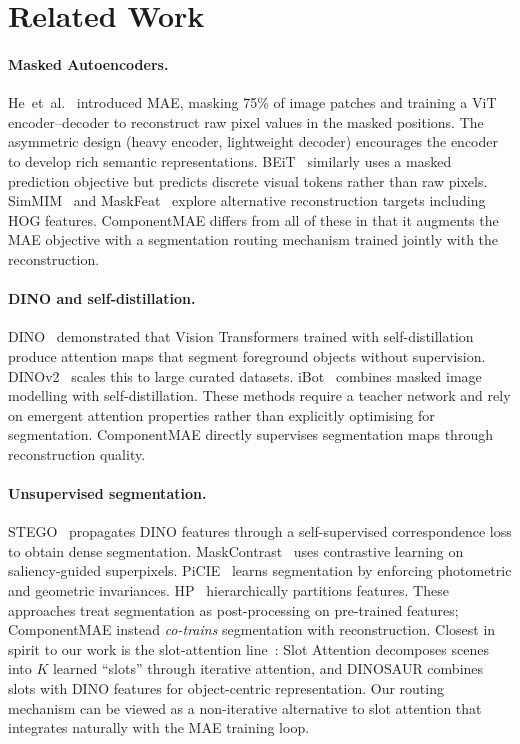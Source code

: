 \documentclass{article}
\begin{document}
\section{Related Work}
\label{sec:related}

\paragraph{Masked Autoencoders.}
He~et~al.~\cite{he2022masked} introduced MAE, masking 75\% of image patches and
training a ViT encoder--decoder to reconstruct raw pixel values in the masked
positions.  The asymmetric design (heavy encoder, lightweight decoder) encourages
the encoder to develop rich semantic representations.  BEiT~\cite{bao2022beit}
similarly uses a masked prediction objective but predicts discrete visual tokens
rather than raw pixels.  SimMIM~\cite{xie2022simmim} and MaskFeat~\cite{wei2022masked}
explore alternative reconstruction targets including HOG features.  ComponentMAE
differs from all of these in that it augments the MAE objective with a segmentation
routing mechanism trained jointly with the reconstruction.

\paragraph{DINO and self-distillation.}
DINO~\cite{caron2021emerging} demonstrated that Vision Transformers trained with
self-distillation produce attention maps that segment foreground objects without
supervision.  DINOv2~\cite{oquab2024dinov2} scales this to large curated datasets.
iBot~\cite{zhou2022image} combines masked image modelling with self-distillation.
These methods require a teacher network and rely on emergent attention properties
rather than explicitly optimising for segmentation.  ComponentMAE directly
supervises segmentation maps through reconstruction quality.

\paragraph{Unsupervised segmentation.}
STEGO~\cite{hamilton2022unsupervised} propagates DINO features through a
self-supervised correspondence loss to obtain dense segmentation.
MaskContrast~\cite{van2021unsupervised} uses contrastive learning on saliency-guided
superpixels.  PiCIE~\cite{cho2021picie} learns segmentation by enforcing
photometric and geometric invariances.  HP~\cite{ke2022unsupervised} hierarchically
partitions features.  These approaches treat segmentation as post-processing on
pre-trained features; ComponentMAE instead \emph{co-trains} segmentation with
reconstruction.  Closest in spirit to our work is the slot-attention
line~\cite{locatello2020object,seitzer2022bridging}: Slot Attention decomposes
scenes into $K$ learned ``slots'' through iterative attention, and DINOSAUR
\cite{seitzer2022bridging} combines slots with DINO features for object-centric
representation.  Our routing mechanism can be viewed as a non-iterative alternative
to slot attention that integrates naturally with the MAE training loop.
\end{document}
